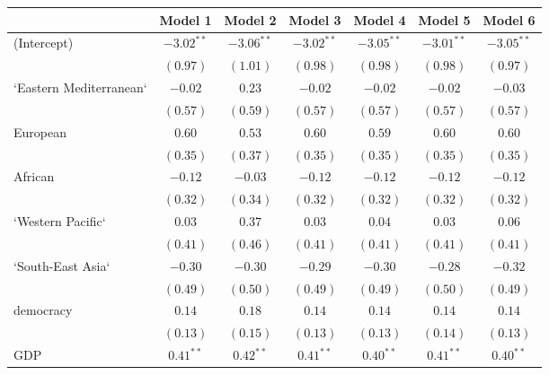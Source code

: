 
\begin{table}[!h]
\begin{center}
\begin{tabular}{l c c c c c c }
\toprule
 & Model 1 & Model 2 & Model 3 & Model 4 & Model 5 & Model 6 \\
\midrule
(Intercept)             & $-3.02^{**}$ & $-3.06^{**}$ & $-3.02^{**}$ & $-3.05^{**}$ & $-3.01^{**}$ & $-3.05^{**}$ \\
                        & $(0.97)$     & $(1.01)$     & $(0.98)$     & $(0.98)$     & $(0.98)$     & $(0.97)$     \\
`Eastern Mediterranean` & $-0.02$      & $0.23$       & $-0.02$      & $-0.02$      & $-0.02$      & $-0.03$      \\
                        & $(0.57)$     & $(0.59)$     & $(0.57)$     & $(0.57)$     & $(0.57)$     & $(0.57)$     \\
European                & $0.60$       & $0.53$       & $0.60$       & $0.59$       & $0.60$       & $0.60$       \\
                        & $(0.35)$     & $(0.37)$     & $(0.35)$     & $(0.35)$     & $(0.35)$     & $(0.35)$     \\
African                 & $-0.12$      & $-0.03$      & $-0.12$      & $-0.12$      & $-0.12$      & $-0.12$      \\
                        & $(0.32)$     & $(0.34)$     & $(0.32)$     & $(0.32)$     & $(0.32)$     & $(0.32)$     \\
`Western Pacific`       & $0.03$       & $0.37$       & $0.03$       & $0.04$       & $0.03$       & $0.06$       \\
                        & $(0.41)$     & $(0.46)$     & $(0.41)$     & $(0.41)$     & $(0.41)$     & $(0.41)$     \\
`South-East Asia`       & $-0.30$      & $-0.30$      & $-0.29$      & $-0.30$      & $-0.28$      & $-0.32$      \\
                        & $(0.49)$     & $(0.50)$     & $(0.49)$     & $(0.49)$     & $(0.50)$     & $(0.49)$     \\
democracy               & $0.14$       & $0.18$       & $0.14$       & $0.14$       & $0.14$       & $0.14$       \\
                        & $(0.13)$     & $(0.15)$     & $(0.13)$     & $(0.13)$     & $(0.14)$     & $(0.13)$     \\
GDP                     & $0.41^{**}$  & $0.42^{**}$  & $0.41^{**}$  & $0.40^{**}$  & $0.41^{**}$  & $0.40^{**}$  \\

\end{tabular}
\end{center}
\end{table}
